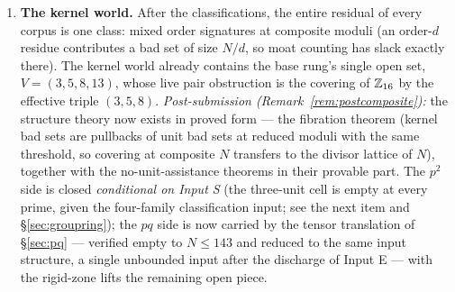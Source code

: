 \begin{enumerate}[leftmargin=1.7em,itemsep=4pt]
\item \textbf{The kernel world.} After the classifications, the entire
  residual of every corpus is one class: mixed order signatures at
  composite moduli (an order-$d$ residue contributes a bad set of size
  $N/d$, so moat counting has slack exactly there). The kernel world
  already contains the base rung's single open set,
  $V=(3,5,8,13)$, whose live pair obstruction is the covering of
  $\mathbb{Z}_{16}$ by the effective triple $(3,5,8)$. \emph{Post-submission
  (Remark~\ref{rem:postcomposite}):} the structure theory now exists in
  proved form --- the fibration theorem (kernel bad sets are pullbacks of
  unit bad sets at reduced moduli with the same threshold, so covering at
  composite $N$ transfers to the divisor lattice of $N$), together with
  the no-unit-assistance theorems in their provable part. The $p^2$ side
  is closed \emph{conditional on Input S} (the three-unit cell is empty
  at every prime, given the four-family classification input; see
  the next item and \S\ref{sec:groupring}); the $pq$ side is now carried
  by the tensor translation
  of \S\ref{sec:pq} --- verified empty to $N\le143$ and reduced to the
  same input structure, a single unbounded input after the
  discharge of Input E --- with the rigid-zone lifts the remaining open
  piece.


\end{enumerate}
